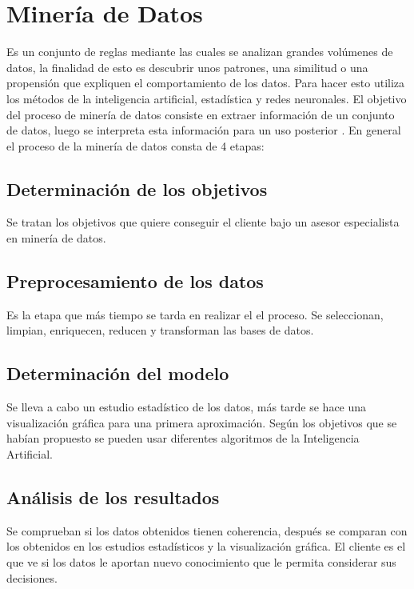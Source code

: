 

\section{Minería de Datos}

Es un conjunto de reglas mediante las cuales se analizan grandes volúmenes de datos, la finalidad de esto es descubrir unos patrones, una similitud o una propensión que expliquen el comportamiento de los datos. Para hacer esto utiliza los métodos de la inteligencia artificial, estadística y redes neuronales.
El objetivo del proceso de minería de datos consiste en extraer información de un conjunto de datos, luego se interpreta esta información para un uso posterior \cite{wiki:datamining}.
En general el proceso de la minería de datos consta de 4 etapas\cite{datamining}:

\subsection{Determinación de los objetivos}

Se tratan los objetivos que quiere conseguir el cliente bajo un asesor especialista en minería de datos.

\subsection{Preprocesamiento de los datos}
	
Es la etapa que más tiempo se tarda en realizar el el proceso. Se seleccionan, limpian, enriquecen, reducen y transforman las bases de datos.

\subsection{Determinación del modelo}

Se lleva a cabo un estudio estadístico de los datos, más tarde se hace una visualización gráfica para una primera aproximación. Según los objetivos que se habían propuesto se pueden usar diferentes algoritmos de la Inteligencia Artificial.

\subsection{Análisis de los resultados}	

Se comprueban si los datos obtenidos tienen coherencia, después se comparan con los obtenidos en los estudios estadísticos y la visualización gráfica. El cliente es el que ve si los datos le aportan nuevo conocimiento que le permita considerar sus decisiones.

